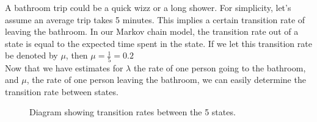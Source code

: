 \begin{comment}
	If a person is currently in the bathroom, what is the transition rate at which they get out? To get this rate, remember that the expected time spent in the bathroom would be the inverse of the transition rate. Let's assume that each toilet trip takes an average of 2 minutes, there is an average of one shower per day lasting 15 minutes (including drying), and a further 5 minutes a day spent brushing teeth and other grooming activities. That's an average of $7\times 2 + 15 + 5 = 34$ minutes per day, or about 5 minutes per trip\footnote{It isn't important what the exact numbers are since these are all approximations anyways. The purpose of this article is to describe an application of Markov chains, not to provide empirically accurate estimates.} (since we've assumed 7 trips per day). If we let $\mu$ denote the transition rate out of the bathroom, $\mu = \frac{1}{5} = 0.2 $
\end{comment}

A bathroom trip could be a quick wizz or a long shower. For simplicity, let's assume an average trip takes 5 minutes. This implies a certain transition rate of leaving the bathroom. In our Markov chain model, the transition rate out of a state is equal to the expected time spent in the state. If we let this transition rate be denoted by $\mu$, then $\mu = \frac{1}{5} = 0.2 $
\\

Now that we have estimates for $\lambda$ the rate of one person going to the bathroom, and $\mu$, the rate of one person leaving the bathroom, we can easily determine the transition rate between states. 

\begin{figure}[H]
	\centering
	\caption{Diagram showing transition rates between the 5 states.}
	\label{fig: bathroom visual}
\end{figure}

